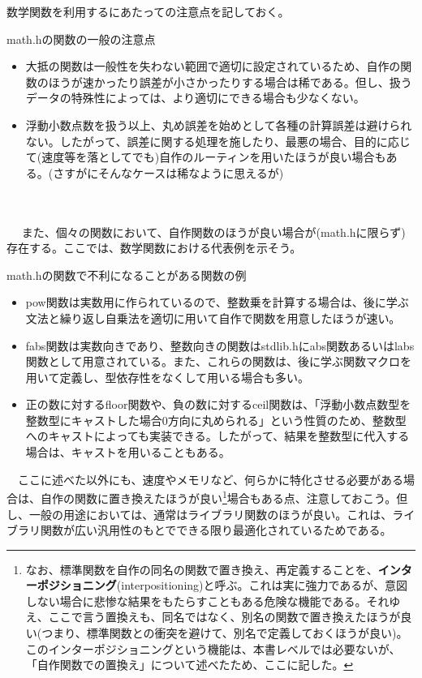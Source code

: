 数学関数を利用するにあたっての注意点を記しておく。
\begin{itembox}[l]{math.hの関数の一般の注意点}
\begin{itemize}
\item 大抵の関数は一般性を失わない範囲で適切に設定されているため、自作の関数のほうが速かったり誤差が小さかったりする場合は稀である。但し、扱うデータの特殊性によっては、より適切にできる場合も少なくない。
\item 浮動小数点数を扱う以上、丸め誤差を始めとして各種の計算誤差は避けられない。したがって、誤差に関する処理を施したり、最悪の場合、目的に応じて(速度等を落としてでも)自作のルーティンを用いたほうが良い場合もある。(さすがにそんなケースは稀なように思えるが)
\end{itemize}
\end{itembox}
\\ \\　
また、個々の関数において、自作関数のほうが良い場合が(math.hに限らず)存在する。ここでは、数学関数における代表例を示そう。
\begin{itembox}[l]{math.hの関数で不利になることがある関数の例}
\begin{itemize}
\item pow関数は実数用に作られているので、整数乗を計算する場合は、後に学ぶ文法と繰り返し自乗法を適切に用いて自作で関数を用意したほうが速い。
\item fabs関数は実数向きであり、整数向きの関数はstdlib.hにabs関数あるいはlabs関数として用意されている。また、これらの関数は、後に学ぶ関数マクロを用いて定義し、型依存性をなくして用いる場合も多い。
\item 正の数に対するfloor関数や、負の数に対するceil関数は、「浮動小数点数型を整数型にキャストした場合0方向に丸められる」という性質のため、整数型へのキャストによっても実装できる。したがって、結果を整数型に代入する場合は、キャストを用いることもある。
\end{itemize}
\end{itembox}
　ここに述べた以外にも、速度やメモリなど、何らかに特化させる必要がある場合は、自作の関数に置き換えたほうが良い\footnote{なお、標準関数を自作の同名の関数で置き換え、再定義することを、\textbf{インターポジショニング}(interpositioning)と呼ぶ。これは実に強力であるが、意図しない場合に悲惨な結果をもたらすこともある危険な機能である。それゆえ、ここで言う置換えも、同名ではなく、別名の関数で置き換えたほうが良い(つまり、標準関数との衝突を避けて、別名で定義しておくほうが良い)。このインターポジショニングという機能は、本書レベルでは必要ないが、「自作関数での置換え」について述べたため、ここに記した。}場合もある点、注意しておこう。但し、一般の用途においては、通常はライブラリ関数のほうが良い。これは、ライブラリ関数が広い汎用性のもとでできる限り最適化されているためである。

